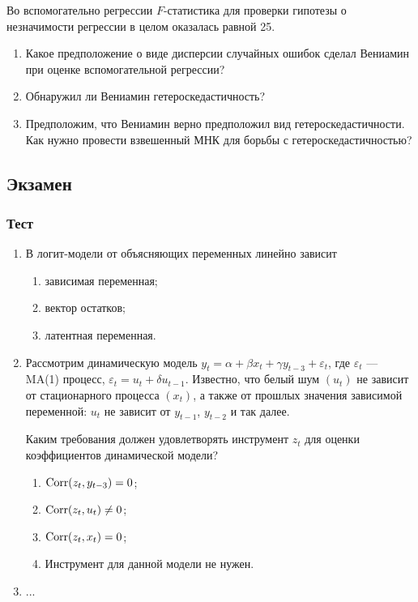 \begin{enumerate}
Во вспомогательно регрессии $F$-статистика для проверки гипотезы о незначимости регрессии в целом оказалась равной 25. 

\begin{enumerate}
  \item Какое предположение о виде дисперсии случайных ошибок сделал Вениамин при оценке вспомогательной регрессии?
  \item Обнаружил ли Вениамин гетероскедастичность?
  \item Предположим, что Вениамин верно предположил вид гетероскедастичности. 
  Как нужно провести взвешенный МНК для борьбы с гетероскедастичностью?
\end{enumerate}

\end{enumerate}



\subsection{Экзамен}

\subsubsection*{Тест}

\begin{enumerate}
  \item В логит-модели от объясняющих переменных линейно зависит
  \begin{enumerate}
    \item зависимая переменная;
    \item вектор остатков;
    \item латентная переменная. 
  \end{enumerate}
  \item Рассмотрим динамическую модель $y_t = \alpha + \beta x_t + \gamma y_{t-3} + \varepsilon_t$, 
  где $\varepsilon_t$ — MA(1) процесс, $\varepsilon_t = u_t + \delta u_{t-1}$. 
  Известно, что белый шум $(u_t)$ не зависит от стационарного процесса $(x_t)$, 
  а также от прошлых значения зависимой переменной: $u_t$ не зависит от $y_{t-1}$, $y_{t-2}$ и так далее. 

  Каким требования должен удовлетворять инструмент $z_t$ для оценки коэффициентов динамической модели?
  \begin{enumerate}
    \item $\operatorname{Corr}(z_t, y_{t-3}) = 0$;
    \item $\operatorname{Corr}(z_t, u_t) \neq 0$;
    \item $\operatorname{Corr}(z_t, x_t) = 0$;
    \item Инструмент для данной модели не нужен. 
  \end{enumerate}
  \item ...
\end{enumerate}

